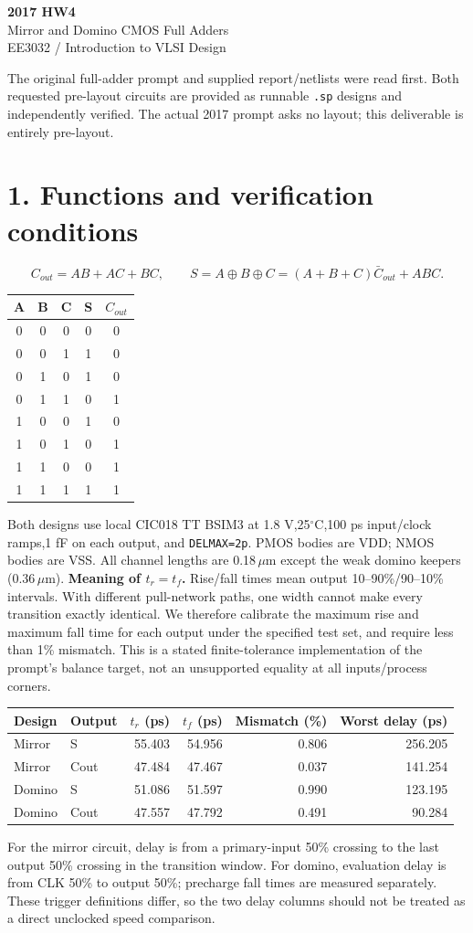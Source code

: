\documentclass[11pt,a4paper]{article}
\begin{document}
\begin{center}{\LARGE\bfseries 2017 HW4}\\[4pt]{\large Mirror and Domino CMOS Full Adders}\\[4pt]{\small EE3032 / Introduction to VLSI Design}\end{center}
The original full-adder prompt and supplied report/netlists were read first. Both requested pre-layout circuits are provided as runnable \texttt{.sp} designs and independently verified. The actual 2017 prompt asks no layout; this deliverable is entirely pre-layout.
\section*{1. Functions and verification conditions}
\[
 C_{out}=AB+AC+BC,\qquad S=A\oplus B\oplus C
 =(A+B+C)\bar C_{out}+ABC.
\]
\begin{center}\begin{tabular}{ccc|cc}\toprule
A&B&C&S&$C_{out}$\\\midrule
0&0&0&0&0\\0&0&1&1&0\\0&1&0&1&0\\0&1&1&0&1\\
1&0&0&1&0\\1&0&1&0&1\\1&1&0&0&1\\1&1&1&1&1\\\bottomrule
\end{tabular}\end{center}
Both designs use local CIC018 TT BSIM3 at 1.8 V,25$^\circ$C,100 ps input/clock ramps,1 fF on each output, and \texttt{DELMAX=2p}. PMOS bodies are VDD; NMOS bodies are VSS. All channel lengths are 0.18$\,\mu$m except the weak domino keepers (0.36$\,\mu$m).
\textbf{Meaning of $t_r=t_f$.} Rise/fall times mean output 10--90\%/90--10\% intervals. With different pull-network paths, one width cannot make every transition exactly identical. We therefore calibrate the maximum rise and maximum fall time for each output under the specified test set, and require less than 1\% mismatch. This is a stated finite-tolerance implementation of the prompt's balance target, not an unsupported equality at all inputs/process corners.
\begin{center}\begin{tabular}{llrrrr}\toprule
Design&Output&$t_r$ (ps)&$t_f$ (ps)&Mismatch (\%)&Worst delay (ps)\\\midrule
Mirror&S&55.403&54.956&0.806&256.205\\
Mirror&Cout&47.484&47.467&0.037&141.254\\
Domino&S&51.086&51.597&0.990&123.195\\
Domino&Cout&47.557&47.792&0.491&90.284\\
\bottomrule\end{tabular}\end{center}
For the mirror circuit, delay is from a primary-input 50\% crossing to the last output 50\% crossing in the transition window. For domino, evaluation delay is from CLK 50\% to output 50\%; precharge fall times are measured separately. These trigger definitions differ, so the two delay columns should not be treated as a direct unclocked speed comparison.
\newpage
\end{document}

